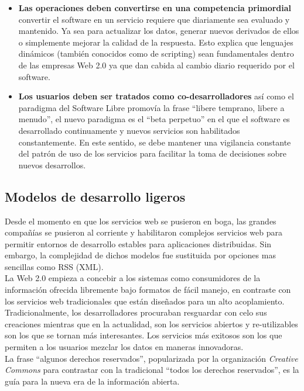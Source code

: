 \begin{itemize}
\item \textbf{Las operaciones deben convertirse en una competencia primordial} convertir el software en un servicio requiere que diariamente sea evaluado y mantenido. Ya sea para actualizar los datos, generar nuevos derivados de ellos o simplemente mejorar la calidad de la respuesta. Esto explica que lenguajes dinámicos (también conocidos como de scripting) sean fundamentales dentro de las empresas Web 2.0 ya que dan cabida al cambio diario requerido por el software.

\item \textbf{Los usuarios deben ser tratados como co-desarrolladores} así como el paradigma del Software Libre promovía la frase ``libere temprano, libere a menudo'', el nuevo paradigma es el ``beta perpetuo'' en el que el software es desarrollado continuamente y nuevos servicios son habilitados constantemente. En este sentido, se debe mantener una vigilancia constante del patrón de uso de los servicios para facilitar la toma de decisiones sobre nuevos desarrollos.

\end{itemize}

\subsection{Modelos de desarrollo ligeros}
Desde el momento en que los servicios web se pusieron en boga, las grandes compañías se pusieron al corriente y habilitaron complejos servicios web para permitir entornos de desarrollo estables para aplicaciones distribuidas. Sin embargo, la complejidad de dichos modelos fue sustituida por opciones mas sencillas como RSS (XML).\\ 

La Web 2.0 empieza a concebir a los sistemas como consumidores de la información ofrecida libremente bajo formatos de fácil manejo, en contraste con los servicios web tradicionales que están diseñados para un alto acoplamiento. Tradicionalmente, los desarrolladores procuraban resguardar con celo sus creaciones mientras que en la actualidad, son los servicios abiertos y re-utilizables son los que se tornan más interesantes. Los servicios más exitosos son los que permiten a los usuarios mezclar los datos en maneras innovadoras.\\

La frase ``algunos derechos reservados'', popularizada por la organización \emph{Creative Commons} para contrastar con la tradicional ``todos los derechos reservados'', es la guía para la nueva era de la información abierta.

